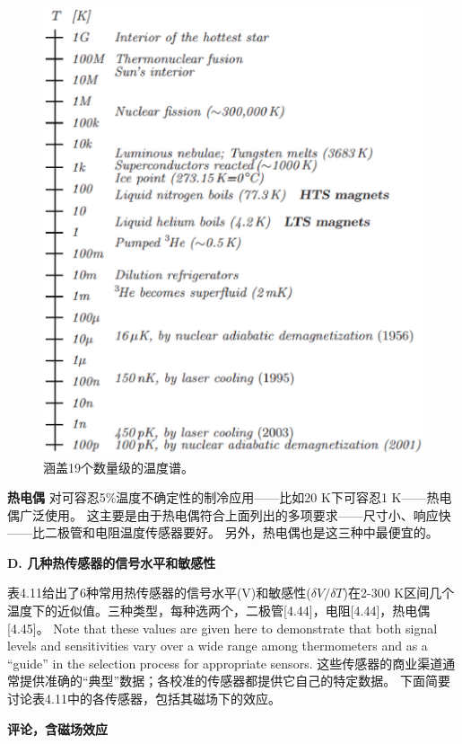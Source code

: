 \begin{figure}[htbp]
	\centering
	\includegraphics[scale=0.7]{chpt4/figs/fig4.19.eps}
	\caption{涵盖19个数量级的温度谱。}
\end{figure}

\textbf{热电偶} 对可容忍5\%温度不确定性的制冷应用——比如20 K下可容忍1 K——热电偶广泛使用。
这主要是由于热电偶符合上面列出的多项要求——尺寸小、响应快——比二极管和电阻温度传感器要好。
另外，热电偶也是这三种中最便宜的。

\textbf{D. 几种热传感器的信号水平和敏感性}

表4.11给出了6种常用热传感器的信号水平(V)和敏感性($\delta V/\delta T$)在2-300 K区间几个温度下的近似值。三种类型，每种选两个，二极管[4.44]，电阻[4.44]，热电偶[4.45]。
Note that these values are given here to demonstrate that both
signal levels and sensitivities vary over a wide range among thermometers and as
a “guide” in the selection process for appropriate sensors. 
这些传感器的商业渠道通常提供准确的“典型”数据；各校准的传感器都提供它自己的特定数据。
下面简要讨论表4.11中的各传感器，包括其磁场下的效应。

\textbf{评论，含磁场效应}

